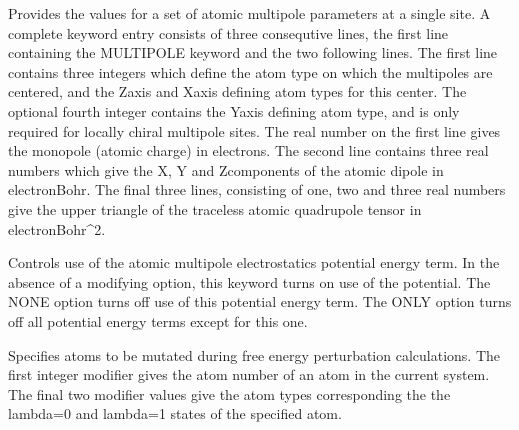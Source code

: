 \documentclass[letterpaper,11pt,english]{sphinxmanual}
\begin{document}
\ignorespaces {}\label{\detokenize{text/keywords:key-multipole}}\begin{description}
\sphinxAtStartPar
Provides the values for a set of atomic multipole parameters at a single site. A complete keyword entry consists of three consequtive lines, the first line containing the MULTIPOLE keyword and the two following lines. The first line contains three integers which define the atom type on which the multipoles are centered, and the Z\sphinxhyphen{}axis and X\sphinxhyphen{}axis defining atom types for this center. The optional fourth integer contains the Y\sphinxhyphen{}axis defining atom type, and is only required for locally chiral multipole sites. The real number on the first line gives the monopole (atomic charge) in electrons. The second line contains three real numbers which give the X\sphinxhyphen{}, Y\sphinxhyphen{} and Z\sphinxhyphen{}components of the atomic dipole in electron\sphinxhyphen{}Bohr. The final three lines, consisting of one, two and three real numbers give the upper triangle of the traceless atomic quadrupole tensor in electron\sphinxhyphen{}Bohr\textasciicircum{}2.

\end{description}

\ignorespaces {}\label{\detokenize{text/keywords:key-multipoleterm}}\begin{description}
\sphinxAtStartPar
Controls use of the atomic multipole electrostatics potential energy term. In the absence of a modifying option, this keyword turns on use of the potential. The NONE option turns off use of this potential energy term. The ONLY option turns off all potential energy terms except for this one.

\end{description}

\ignorespaces {}\label{\detokenize{text/keywords:key-mutate}}\begin{description}
\sphinxAtStartPar
Specifies atoms to be mutated during free energy perturbation calculations. The first integer modifier gives the atom number of an atom in the current system. The final two modifier values give the atom types corresponding the the lambda=0 and lambda=1 states of the specified atom.

\end{description}
\end{document}
